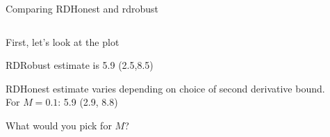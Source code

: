 \documentclass[notes,11pt, aspectratio=169]{beamer}
\newenvironment{wideitemize}{\itemize\addtolength{\itemsep}{10pt}}{\enditemize}
\begin{document}
\begin{frame}{Comparing RDHonest and rdrobust}
    \begin{columns}[onlytextwidth, T] %
      \begin{column}{.3\textwidth}
        \begin{wideitemize}
        \item First, let's look at the plot
        \item RDRobust estimate is 5.9 (2.5,8.5)
        \item RDHonest estimate varies depending on choice of second
          derivative bound. For $M=0.1$: 5.9 (2.9, 8.8)
        \item What would you pick for $M$?
        \end{wideitemize}
      \end{column}%
      \hfill%
      \begin{column}{.7\textwidth}

\end{column}
\end{columns}
\end{frame}
\end{document}
